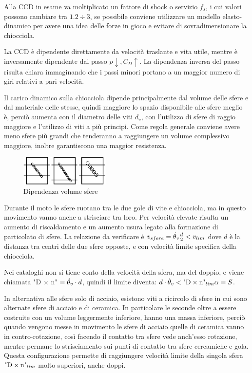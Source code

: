 Alla CCD in esame va moltiplicato un fattore di shock o servizio \( f_s \), i cui valori possono cambiare tra \( 1.2 \div 3 \), se possibile conviene utilizzare un modello elasto-dinamico per avere una idea delle forze in gioco e evitare di sovradimensionare la chiocciola.

La CCD è dipendente direttamente da velocità traslante e vita utile, mentre è inversamente dipendente dal passo \( p \downarrow, C_D \uparrow\). La dipendenza inversa del passo risulta chiara immaginando che i passi minori portano a un maggior numero di giri relativi a pari velocità.

Il carico dinamico sulla chiocciola dipende principalmente dal volume delle sfere e dal materiale delle stesse, quindi maggiore lo spazio disponibile alle sfere meglio è, perciò aumenta con il diametro delle viti \(d_v\), con l'utilizzo di sfere di raggio maggiore e l'utilizzo di viti a più principi.
Come regola generale conviene avere meno sfere più grandi che tenderanno a raggiungere un volume complessivo maggiore, inoltre garantiscono una maggior resistenza.

\begin{figure}[h]
    \centering
    \includegraphics[width=0.4\textwidth]{Immagini/CCD_chiocciola_sfere.png}
    \caption{Dipendenza volume sfere}
\end{figure}

Durante il moto le sfere ruotano tra le due gole di vite e chiocciola, ma in questo movimento vanno anche a strisciare tra loro. Per velocità elevate risulta un aumento di riscaldamento e un aumento usura legato alla formazione di particolato di sfere.
La relazione da verificare è \( v_{sfere} = \dot{\theta}_v \frac{d}{2} < v_{lim} \) dove \(d\) è la distanza tra centri delle due sfere opposte, e con velocità limite specifica della chiocciola.

Nei cataloghi non si tiene conto della velocità della sfera, ma del doppio, e viene chiamata "D \(\times\) n" \(= \dot{\theta}_v\cdot d \), quindi  il limite diventa: \(d \cdot \dot{\theta}_v < \text{"D}\times \text{n"}_{lim} \alpha = S \).

In alternativa alle sfere solo di acciaio, esistono viti a ricircolo di sfere in cui sono alternate sfere di acciaio e di ceramica. In particolare le seconde oltre a essere costruite con un volume leggermente inferiore, hanno una massa inferiore, perciò quando vengono messe in movimento le sfere di acciaio quelle di ceramica vanno in contro-rotazione, così facendo il contatto tra sfere vede anch'esso rotazione, mentre permane lo strisciamento sui punti di contatto tra sfere cercamiche e gola. Questa configurazione permette di raggiungere velocità limite della singola sfera \( \text{"D}\times \text{n"}_{lim} \) molto superiori, anche doppi.

